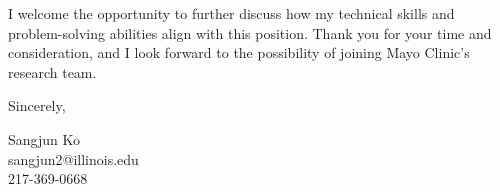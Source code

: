 \documentclass[11pt]{article}
\begin{document}
I welcome the opportunity to further discuss how my technical skills and problem-solving abilities align with this position. Thank you for your time and consideration, and I look forward to the possibility of joining Mayo Clinic’s research team.

\vspace{1em}

Sincerely,

\vspace{2em}

\noindent
Sangjun Ko\\
sangjun2@illinois.edu\\
217-369-0668
\end{document}
